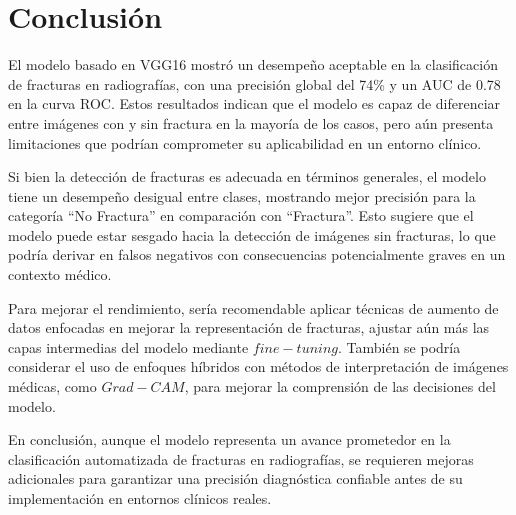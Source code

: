 \documentclass[journal]{IEEEtran}
\begin{document}
\section{Conclusión}
El modelo basado en VGG16 mostró un desempeño aceptable en la clasificación de fracturas en radiografías, con una precisión global del 74\% y un AUC de 0.78 en la curva ROC. Estos resultados indican que el modelo es capaz de diferenciar entre imágenes con y sin fractura en la mayoría de los casos, pero aún presenta limitaciones que podrían comprometer su aplicabilidad en un entorno clínico.

Si bien la detección de fracturas es adecuada en términos generales, el modelo tiene un desempeño desigual entre clases, mostrando mejor precisión para la categoría “No Fractura” en comparación con “Fractura”. Esto sugiere que el modelo puede estar sesgado hacia la detección de imágenes sin fracturas, lo que podría derivar en falsos negativos con consecuencias potencialmente graves en un contexto médico.

Para mejorar el rendimiento, sería recomendable aplicar técnicas de aumento de datos enfocadas en mejorar la representación de fracturas, ajustar aún más las capas intermedias del modelo mediante $fine-tuning$. También se podría considerar el uso de enfoques híbridos con métodos de interpretación de imágenes médicas, como $Grad-CAM$, para mejorar la comprensión de las decisiones del modelo.

En conclusión, aunque el modelo representa un avance prometedor en la clasificación automatizada de fracturas en radiografías, se requieren mejoras adicionales para garantizar una precisión diagnóstica confiable antes de su implementación en entornos clínicos reales.
\ifCLASSOPTIONcaptionsoff
  \newpage
\fi





%
%
%

\end{document}
